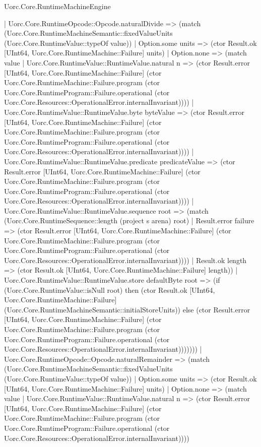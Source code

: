 \begin{lexlean}{Uorc.Core.RuntimeMachineEngine}
\begin{semanticmodule}
{          | Uorc.Core.RuntimeOpcode::Opcode.naturalDivide => (match (Uorc.Core.RuntimeMachineSemantic::fixedValueUnits (Uorc.Core.RuntimeValue::typeOf value))
            | Option.some units => (ctor Result.ok [UInt64, Uorc.Core.RuntimeMachine::Failure] units)
            | Option.none => (match value
              | Uorc.Core.RuntimeValue::RuntimeValue.natural n => (ctor Result.error [UInt64, Uorc.Core.RuntimeMachine::Failure] (ctor Uorc.Core.RuntimeMachine::Failure.program (ctor Uorc.Core.RuntimeProgram::Failure.operational (ctor Uorc.Core.Resources::OperationalError.internalInvariant))))
              | Uorc.Core.RuntimeValue::RuntimeValue.byte byteValue => (ctor Result.error [UInt64, Uorc.Core.RuntimeMachine::Failure] (ctor Uorc.Core.RuntimeMachine::Failure.program (ctor Uorc.Core.RuntimeProgram::Failure.operational (ctor Uorc.Core.Resources::OperationalError.internalInvariant))))
              | Uorc.Core.RuntimeValue::RuntimeValue.predicate predicateValue => (ctor Result.error [UInt64, Uorc.Core.RuntimeMachine::Failure] (ctor Uorc.Core.RuntimeMachine::Failure.program (ctor Uorc.Core.RuntimeProgram::Failure.operational (ctor Uorc.Core.Resources::OperationalError.internalInvariant))))
              | Uorc.Core.RuntimeValue::RuntimeValue.sequence root => (match (Uorc.Core.RuntimeSequence::length (project s arena) root)
                | Result.error failure => (ctor Result.error [UInt64, Uorc.Core.RuntimeMachine::Failure] (ctor Uorc.Core.RuntimeMachine::Failure.program (ctor Uorc.Core.RuntimeProgram::Failure.operational (ctor Uorc.Core.Resources::OperationalError.internalInvariant))))
                | Result.ok length => (ctor Result.ok [UInt64, Uorc.Core.RuntimeMachine::Failure] length))
              | Uorc.Core.RuntimeValue::RuntimeValue.store defaultByte root => (if (Uorc.Core.RuntimeValue::isNull root) then (ctor Result.ok [UInt64, Uorc.Core.RuntimeMachine::Failure] (Uorc.Core.RuntimeMachineSemantic::initialStoreUnits)) else (ctor Result.error [UInt64, Uorc.Core.RuntimeMachine::Failure] (ctor Uorc.Core.RuntimeMachine::Failure.program (ctor Uorc.Core.RuntimeProgram::Failure.operational (ctor Uorc.Core.Resources::OperationalError.internalInvariant)))))))
          | Uorc.Core.RuntimeOpcode::Opcode.naturalRemainder => (match (Uorc.Core.RuntimeMachineSemantic::fixedValueUnits (Uorc.Core.RuntimeValue::typeOf value))
            | Option.some units => (ctor Result.ok [UInt64, Uorc.Core.RuntimeMachine::Failure] units)
            | Option.none => (match value
              | Uorc.Core.RuntimeValue::RuntimeValue.natural n => (ctor Result.error [UInt64, Uorc.Core.RuntimeMachine::Failure] (ctor Uorc.Core.RuntimeMachine::Failure.program (ctor Uorc.Core.RuntimeProgram::Failure.operational (ctor Uorc.Core.Resources::OperationalError.internalInvariant))))
}
\end{semanticmodule}
\end{lexlean}
